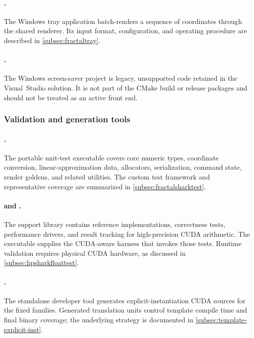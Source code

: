 \paragraph{.}
The Windows tray application batch-renders a sequence of coordinates through
the shared renderer.  Its input format, configuration, and operating procedure
are described in \cref{subsec:fractaltray}.

\paragraph{.}
The Windows screen-saver project is legacy, unsupported code retained in the
Visual~Studio solution.  It is not part of the CMake build or release packages
and should not be treated as an active front end.

\subsubsection{Validation and generation tools}

\paragraph{.}
The portable unit-test executable covers core numeric types, coordinate
conversion, linear-approximation data, allocators, serialization, command
state, render goldens, and related utilities.  The custom test framework and
representative coverage are summarized in \cref{subsec:fractalsharktest}.

\paragraph{ and .}
The support library contains reference implementations, correctness tests,
performance drivers, and result tracking for high-precision CUDA arithmetic.
The executable supplies the CUDA-aware harness that invokes those tests.
Runtime validation requires physical CUDA hardware, as discussed in
\cref{subsec:hpsharkfloattest}.

\paragraph{.}
The standalone developer tool generates explicit-instantiation CUDA sources
for the fixed  families.  Generated translation units
control template compile time and final binary coverage; the underlying
strategy is documented in \cref{subsec:template-explicit-inst}.

